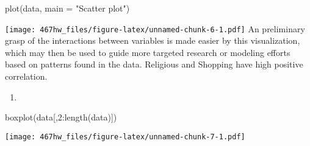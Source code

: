 \documentclass[
]{article}
\newenvironment{Shaded}{\begin{snugshade}}{\end{snugshade}}
\newcommand{\AttributeTok}[1]{\textcolor[rgb]{0.77,0.63,0.00}{#1}}
\newcommand{\DecValTok}[1]{\textcolor[rgb]{0.00,0.00,0.81}{#1}}
\newcommand{\FunctionTok}[1]{\textcolor[rgb]{0.00,0.00,0.00}{#1}}
\newcommand{\NormalTok}[1]{#1}
\newcommand{\SpecialCharTok}[1]{\textcolor[rgb]{0.00,0.00,0.00}{#1}}
\newcommand{\StringTok}[1]{\textcolor[rgb]{0.31,0.60,0.02}{#1}}
\providecommand{\tightlist}{%
  \setlength{\itemsep}{0pt}\setlength{\parskip}{0pt}}
\begin{document}
\begin{Shaded}
\begin{Highlighting}[]
\FunctionTok{plot}\NormalTok{(data, }\AttributeTok{main =} \StringTok{"Scatter plot"}\NormalTok{)}
\end{Highlighting}
\end{Shaded}

\texttt{[image: 467hw\_files/figure-latex/unnamed-chunk-6-1.pdf]} An
preliminary grasp of the interactions between variables is made easier
by this visualization, which may then be used to guide more targeted
research or modeling efforts based on patterns found in the data.
Religious and Shopping have high positive correlation.

\begin{enumerate}
\def\labelenumi{\alph{enumi})}
\setcounter{enumi}{3}
\tightlist
\item
\end{enumerate}

\begin{Shaded}
\begin{Highlighting}[]
\FunctionTok{boxplot}\NormalTok{(data[,}\DecValTok{2}\SpecialCharTok{:}\FunctionTok{length}\NormalTok{(data)])}
\end{Highlighting}
\end{Shaded}

\texttt{[image: 467hw\_files/figure-latex/unnamed-chunk-7-1.pdf]}
\end{document}
